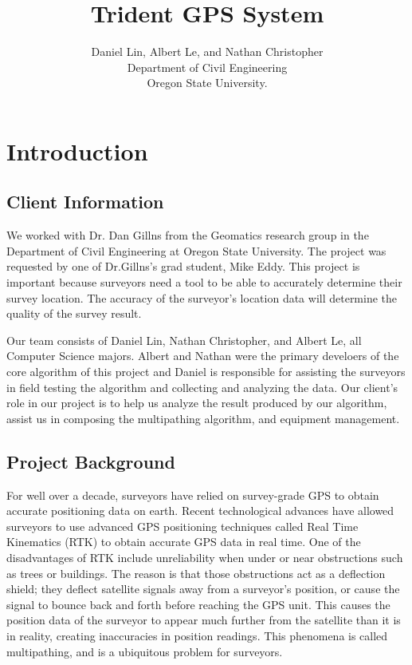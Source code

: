 \documentclass[12pt]{article}
\title{Trident GPS System }
\author{Daniel Lin, Albert Le, and Nathan Christopher\\ Department of Civil Engineering \\ Oregon State University.}
\begin{document}
\maketitle

\tableofcontents
\clearpage

\section{Introduction}
\subsection{Client Information}
We worked with Dr. Dan Gillns from the Geomatics research group in the Department of Civil Engineering at Oregon State University. The project was requested by one of Dr.Gillns's grad student, Mike Eddy. This project is important because surveyors need a tool to be able to accurately determine their survey location. The accuracy of the surveyor's location data will determine the quality of the survey result. 

Our team consists of Daniel Lin, Nathan Christopher, and Albert Le, all Computer Science majors. Albert and Nathan were the primary develoers of the core algorithm of this project and Daniel is responsible for assisting the surveyors in field testing the algorithm and collecting and analyzing the data. Our client's role in our project is to help us analyze the result produced by our algorithm, assist us in composing the multipathing algorithm, and equipment management. 
\subsection{Project Background}
For well over a decade, surveyors have relied on survey-grade GPS to obtain accurate positioning data on earth. Recent technological advances have allowed surveyors to use advanced GPS positioning techniques called Real Time Kinematics (RTK) to obtain accurate GPS data in real time. One of the disadvantages of RTK include unreliability when under or near obstructions such as trees or buildings. The reason is that those obstructions act as a deflection shield; they deflect satellite signals away from a surveyor’s position, or cause the signal to bounce back and forth before reaching the GPS unit. This causes the position data of the surveyor to appear much further from the satellite than it is in reality, creating inaccuracies in position readings. This phenomena is called multipathing, and is a ubiquitous problem for surveyors.
\end{document}
